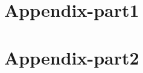 \documentclass[12pt]{article}
\begin{document}




\appendix
\section{Appendix-part1}

\section{Appendix-part2}

\clearpage


\end{document}
